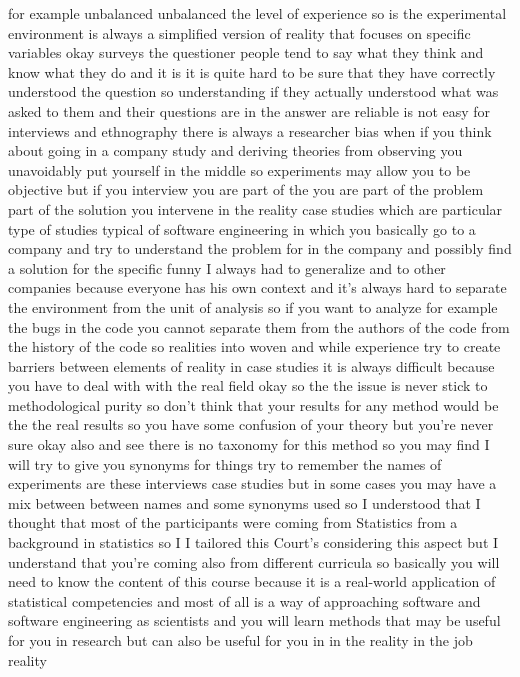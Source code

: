 \documentclass[conference, compsoc, twoside]{IEEEtran}
\begin{document}
for example unbalanced unbalanced the level of experience so is the experimental environment is always a simplified version of reality that focuses on specific variables okay surveys the questioner people tend to say what they think and know what they do and it is it is quite hard to be sure that they have correctly understood the question so understanding if they actually understood what was asked to them and their questions are in the answer are reliable is not easy for interviews and ethnography there is always a researcher bias when if you think about going in a company study and deriving theories from observing you unavoidably put yourself in the middle so experiments may allow you to be objective but if you interview you are part of the you are part of the problem part of the solution you intervene in the reality case studies which are particular type of studies typical of software engineering in which you basically go to a company and try to understand the problem for in the company and possibly find a solution for the specific funny I always had to generalize and to other companies because everyone has his own context and it's always hard to separate the environment from the unit of analysis so if you want to analyze 
for example the bugs in the code you cannot separate them from the authors of the code from the history of the code so realities into woven and while experience try to create barriers between elements of reality in case studies it is always difficult because you have to deal with with the real field okay so the the issue is never stick to methodological purity so don't think that your results for any method would be the the real results so you have some confusion of your theory but you're never sure okay also and see there is no taxonomy for this method so you may find I will try to give you synonyms for things try to remember the names of experiments are these interviews case studies but in some cases you may have a mix between between names and some synonyms used 
so I understood that I thought that most of the participants were coming from Statistics from a background in statistics 
so I I tailored this Court's considering this aspect but I understand that you're coming also from different curricula so basically you will need to know the content of this course because it is a real-world application of statistical competencies and most of all is a way of approaching software and software engineering as scientists and you will learn methods that may be useful for you in research but can also be useful for you in in the reality in the job reality 
\end{document}
